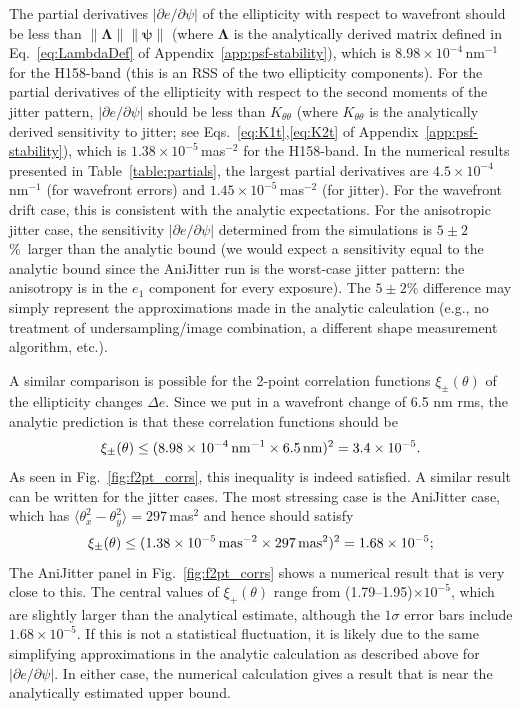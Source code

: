 \documentclass[usenatbib]{mnras}
\begin{document}
The partial derivatives $|\partial e/\partial\psi|$ of the ellipticity with respect to wavefront should be less than $\lVert {\boldsymbol\Lambda} \rVert \lVert {\boldsymbol\psi} \rVert$ (where ${\boldsymbol\Lambda}$ is the analytically derived matrix defined in Eq.~\ref{eq:LambdaDef} of Appendix~\ref{app:psf-stability}), which is $8.98\times 10^{-4}\,$nm$^{-1}$ for the H158-band (this is an RSS of the two ellipticity components). For the partial derivatives of the ellipticity with respect to the second moments of the jitter pattern, $|\partial e/\partial\psi|$ should be less than $K_{\theta\theta}$ (where $K_{\theta\theta}$ is the analytically derived sensitivity to jitter; see Eqs.~\ref{eq:K1t},\ref{eq:K2t} of Appendix~\ref{app:psf-stability}), which is $1.38\times 10^{-5}$\,mas$^{-2}$ for the H158-band. In the numerical results presented in Table~\ref{table:partials}, the largest partial derivatives are $4.5\times 10^{-4}\,$nm$^{-1}$ (for wavefront errors) and $1.45\times 10^{-5}$\,mas$^{-2}$ (for jitter). For the wavefront drift case, this is consistent with the analytic expectations. For the anisotropic jitter case, the sensitivity $|\partial e/\partial\psi|$ determined from the simulations is $5\pm 2$\%\ larger than the analytic bound (we would expect a sensitivity equal to the analytic bound since the AniJitter run is the worst-case jitter pattern: the anisotropy is in the $e_1$ component for every exposure). The $5\pm 2$\% difference may simply represent the approximations made in the analytic calculation (e.g., no treatment of undersampling/image combination, a different shape measurement algorithm, etc.).

A similar comparison is possible for the 2-point correlation functions $\xi_\pm(\theta)$ of the ellipticity changes $\Delta e$. Since we put in a wavefront change of 6.5 nm rms, the analytic prediction is that these correlation functions should be
\begin{equation}
\xi_\pm(\theta) \le (8.98\times 10^{-4}\,{\rm nm}^{-1} \times 6.5\,{\rm nm})^2 = 3.4\times 10^{-5}.
\end{equation}
As seen in Fig.~\ref{fig:f2pt_corrs}, this inequality is indeed satisfied.
A similar result can be written for the jitter cases. The most stressing case is the AniJitter case, which has $\langle\theta_x^2 - \theta_y^2\rangle = 297\,$mas$^2$ and hence should satisfy
\begin{equation}
\xi_\pm(\theta) \le (1.38\times 10^{-5}\,{\rm mas}^{-2}\times 297\,{\rm mas}^2)^2
= 1.68\times 10^{-5};
\end{equation}
The AniJitter panel in Fig.~\ref{fig:f2pt_corrs} shows a numerical result that is very close to this. The central values of $\xi_+(\theta)$ range from (1.79--1.95)$\times 10^{-5}$, which are slightly larger than the analytical estimate, although the $1\sigma$ error bars include $1.68\times 10^{-5}$. If this is not a statistical fluctuation, it is likely due to the same simplifying approximations in the analytic calculation as described above for $|\partial e/\partial\psi|$. In either case, the numerical calculation gives a result that is near the analytically estimated upper bound.
\end{document}
